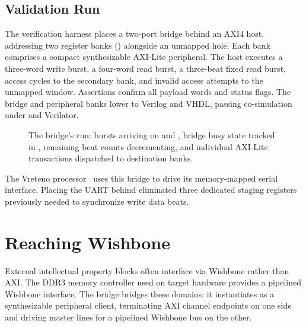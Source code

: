 \documentclass[journal,9pt]{IEEEtran}
\begin{document}
\subsection*{Validation Run}

The verification harness  places a two-port bridge behind
an AXI4 host, addressing two register banks () alongside an
unmapped hole. Each bank comprises a compact synthesizable AXI-Lite
peripheral. The host executes a three-word write burst, a four-word read
burst, a three-beat fixed read burst, access cycles to the secondary bank,
and invalid access attempts to the unmapped window. Assertions confirm all
payload words and status flags. The bridge and peripheral banks lower to
Verilog and VHDL, passing co-simulation under  and Verilator.

\begin{figure}[t]
\centering

\caption{The bridge's run: bursts arriving on  and , bridge
busy state tracked in , remaining beat counts decrementing, and
individual AXI-Lite transactions dispatched to destination banks.}
\label{fig:a-lite}
\end{figure}





The Vreteno processor~\cite{vreteno} uses this bridge to drive its
memory-mapped serial interface. Placing the UART behind
 eliminated three dedicated staging registers
previously needed to synchronize write data beats.

\section{Reaching Wishbone}
\label{sec:a-wb}

External intellectual property blocks often interface via Wishbone rather
than AXI. The DDR3 memory controller used on target hardware provides a
pipelined Wishbone interface. The bridge  bridges these
domains: it instantiates as a synthesizable peripheral client, terminating
AXI channel endpoints on one side and driving master lines for a pipelined
Wishbone bus on the other.
\end{document}

